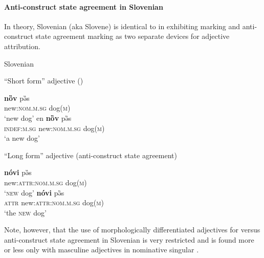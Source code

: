 \paragraph*{Anti\hyp{}construct state agreement in Slovenian}
\label{slovenian synchr}
In theory, Slovenian (aka Slovene) is identical to  in exhibiting  marking and anti\hyp{}construct state agreement marking as two separate devices for adjective attribution.
\begin{exe}
\ex \rm{Slovenian \citep[410]{priestly1993}}
\label{slov longshort}
\begin{xlist}
\ex \rm{“Short form” adjective ()}
\begin{xlist}
\ex
\gll 	\textbf{nȍv} pə̏s\\
	new:\textsc{nom.m.sg} dog\textsc{(m)}\\
\glt	‘new dog’
\ex	
\gll	en \textbf{nȍv} pə̏s\\
	\textsc{indef:m.sg} new:\textsc{nom.m.sg} dog\textsc{(m)}\\
\glt	‘a new dog’
\end{xlist}
\ex \rm{“Long form” adjective (anti\hyp{}construct state agreement)}
\begin{xlist}
\ex	
\gll	\textbf{nóvi} pə̏s\\
	new:\textsc{attr:nom.m.sg} dog\textsc{(m)}\\
\glt	‘\textsc{new} dog’
\ex
{} \textbf{nóvi} pə̏s\\
	{\textsc{attr}} new:\textsc{attr:nom.m.sg} dog\textsc{(m)}\\
\glt	 ‘the \textsc{new} dog’
\end{xlist}
\end{xlist}
\end{exe}
Note, however, that the use of morphologically differentiated adjectives for  versus anti\hyp{}construct state agreement in Slovenian is very restricted and is found more or less only with masculine adjectives in nominative singular \citep[410–411]{priestly1993}.

